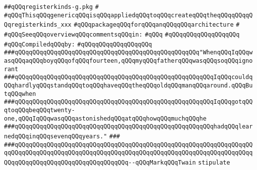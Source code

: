 \label{src/lib/compiler/back/low/code/registerkinds-g.pkg}
\verb|##qQQqregisterkinds-g.pkg|\newline
\verb|#|\newline
\verb|#qQQqThisqQQqgenericqQQqisqQQqappliedqQQqtoqQQqcreateqQQqtheqQQqqQQqqQQqregisterkinds_xxx|\newline
\verb|#qQQqpackageqQQqforqQQqanqQQqqQQqarchitecture|\newline
\verb|#|\newline
\verb|#qQQqSeeqQQqoverviewqQQqcommentsqQQqin:|\newline
\verb|#qQQq|\newline
\verb|#qQQqqQQqqQQqqQQqqQQq|\newline
\newline
\verb|#qQQqCompiledqQQqby:|\newline
\verb|#qQQqqQQqqQQqqQQqqQQq|\newline
\newline
\newline
\newline
\newline
\verb|###qQQqqQQqqQQqqQQqqQQqqQQqqQQqqQQqqQQqqQQqqQQqqQQqqQQq"WhenqQQqIqQQqwasqQQqaqQQqboyqQQqofqQQqfourteen,qQQqmyqQQqfatherqQQqwasqQQqsoqQQqignorant|\newline
\verb|###qQQqqQQqqQQqqQQqqQQqqQQqqQQqqQQqqQQqqQQqqQQqqQQqqQQqqQQqIqQQqcouldqQQqhardlyqQQqstandqQQqtoqQQqhaveqQQqtheqQQqoldqQQqmanqQQqaround.qQQqButqQQqwhen|\newline
\verb|###qQQqqQQqqQQqqQQqqQQqqQQqqQQqqQQqqQQqqQQqqQQqqQQqqQQqqQQqIqQQqgotqQQqtoqQQqbeqQQqtwenty-one,qQQqIqQQqwasqQQqastonishedqQQqatqQQqhowqQQqmuchqQQqhe|\newline
\verb|###qQQqqQQqqQQqqQQqqQQqqQQqqQQqqQQqqQQqqQQqqQQqqQQqqQQqqQQqhadqQQqlearnedqQQqinqQQqsevenqQQqyears."|\newline
\verb|###|\newline
\verb|###qQQqqQQqqQQqqQQqqQQqqQQqqQQqqQQqqQQqqQQqqQQqqQQqqQQqqQQqqQQqqQQqqQQqqQQqqQQqqQQqqQQqqQQqqQQqqQQqqQQqqQQqqQQqqQQqqQQqqQQqqQQqqQQqqQQqqQQqqQQqqQQqqQQqqQQqqQQqqQQqqQQqqQQqqQQq--qQQqMarkqQQqTwain|\newline
\newline
\newline
\newline
\verb|stipulate|\newline

